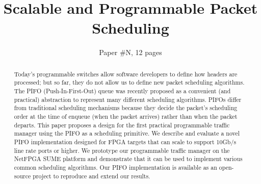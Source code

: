 \documentclass[format=sigconf,10pt]{acmart}
\begin{document}
\title{Scalable and Programmable Packet Scheduling}
\subtitle{Paper \#N, 12 pages}










\begin{abstract}
Today's programmable switches allow software developers to define how headers are processed; but so far, they do not allow us to define new packet scheduling algorithms. The PIFO (Push-In-First-Out) queue was recently proposed as a convenient (and practical) abstraction to represent many different scheduling algorithms. PIFOs differ from traditional scheduling mechanisms because they decide the packet's scheduling order at the time of enqueue (when the packet arrives) rather than when the packet departs. This paper proposes a design for the first practical programmable traffic manager using the PIFO as a scheduling primitive. We describe and evaluate a novel PIFO implementation designed for FPGA targets that can scale to support 10Gb/s line rate ports or higher. We prototype our programmable traffic manager on the NetFPGA SUME platform and demonstrate that it can be used to implement various common scheduling algorithms. Our PIFO implementation is available as an open-source project to reproduce and extend our results.
\end{abstract}
\end{document}
